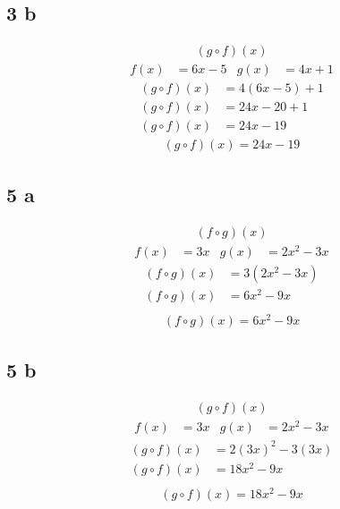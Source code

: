 \documentclass{article}
\begin{document}
    \subsection*{3 b}
    \begin{align*}
    (g \circ f)(x)
    \end{align*}
    \begin{align*}
        f(x) &= 6x -5  &g(x) &= 4x +1
    \end{align*}
    \begin{align*}
    (g \circ f)(x) &= 4(6x -5) +1\\
    (g \circ f)(x) &= 24x -20 +1 \\
    (g \circ f)(x) &= 24x -19
    \end{align*}
    \begin{align*}
        \boxed{(g \circ f)(x) = 24x -19}
    \end{align*}

    \subsection*{5 a}
    \begin{align*}
    (f \circ g)(x)
    \end{align*}
    \begin{align*}
        f(x) &= 3x  &g(x) &= 2x^2 - 3x
    \end{align*}
    \begin{align*}
    (f \circ g)(x) &= 3(2x^2 - 3x)\\
    (f \circ g)(x) &= 6x^2 - 9x\\
    \end{align*}
    \begin{align*}
        \boxed{(f \circ g)(x) = 6x^2 - 9x}
    \end{align*}

    \subsection*{5 b}
    \begin{align*}
    (g \circ f)(x)
    \end{align*}
    \begin{align*}
        f(x) &= 3x  &g(x) &= 2x^2 - 3x
    \end{align*}
    \begin{align*}
    (g \circ f)(x) &= 2(3x)^2 - 3(3x)\\
    (g \circ f)(x) &= 18x^2 - 9x \\
    \end{align*}
    \begin{align*}
        \boxed{(g \circ f)(x) = 18x^2 - 9x}
    \end{align*}
\end{document}
